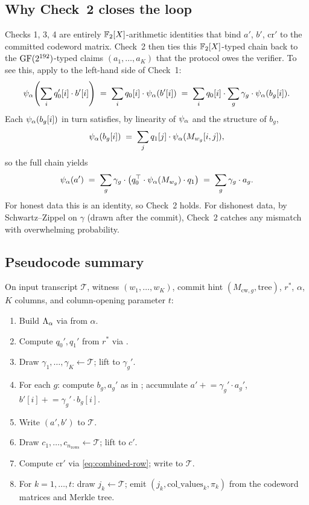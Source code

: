 \subsection{Why Check~2 closes the loop}

Checks 1, 3, 4 are entirely $\mathbb{F}_2[X]$-arithmetic identities that
bind $a'$, $b'$, $\mathrm{cr}'$ to the committed codeword matrix.
Check~2 then ties this $\mathbb{F}_2[X]$-typed chain back to the
$\mathrm{GF}(2^{192})$-typed claims $(a_1, \ldots, a_K)$ that the protocol owes the
verifier. To see this, apply  to the
left-hand side of Check~1:
\[
  \psi_{\alpha}\!\left(\sum_i q_0'[i] \cdot b'[i]\right)
  \;=\;
  \sum_i q_0[i] \cdot \psi_{\alpha}(b'[i])
  \;=\;
  \sum_i q_0[i] \cdot \sum_g \gamma_g \cdot \psi_{\alpha}(b_g[i]).
\]
Each $\psi_{\alpha}(b_g[i])$ in turn satisfies, by linearity of $\psi_{\alpha}$ and
the structure of $b_g$,
\[
  \psi_{\alpha}(b_g[i]) \;=\;
  \sum_j q_1[j] \cdot \psi_{\alpha}(M_{w_g}[i, j]),
\]
so the full chain yields
\[
  \psi_{\alpha}(a')
  \;=\;
  \sum_g \gamma_g \cdot \big( q_0^\top \cdot \psi_{\alpha}(M_{w_g}) \cdot q_1 \big)
  \;=\;
  \sum_g \gamma_g \cdot a_g.
\]
For honest data this is an identity, so Check~2 holds. For dishonest
data, by Schwartz–Zippel on $\gamma$ (drawn after the commit),
Check~2 catches any mismatch with overwhelming probability.

\subsection{Pseudocode summary}

\begin{construction}
\label{cons:prover}
On input transcript $\mathcal{T}$, witness $(w_1, \ldots, w_K)$, commit
hint $(M_{\mathrm{cw}, g}, \mathrm{tree})$, $r^*$, $\alpha$, $K$
columns, and column-opening parameter $t$:
\begin{enumerate}[leftmargin=2em]
  \item Build $\Lambda_{\alpha}$ via  from $\alpha$.
  \item Compute $q_0', q_1'$ from $r^*$ via .
  \item Draw $\gamma_1, \ldots, \gamma_K \leftarrow \mathcal{T}$; lift to $\gamma_g'$.
  \item For each $g$: compute $b_g, a_g'$ as in ; accumulate
    $a' \mathrel{+}= \gamma_g' \cdot a_g'$, $b'[i] \mathrel{+}= \gamma_g' \cdot b_g[i]$.
  \item Write $(a', b')$ to $\mathcal{T}$.
  \item Draw $c_1, \ldots, c_{n_{\mathrm{rows}}} \leftarrow \mathcal{T}$; lift to $c'$.
  \item Compute $\mathrm{cr}'$ via \cref{eq:combined-row}; write to $\mathcal{T}$.
  \item For $k = 1, \ldots, t$: draw $j_k \leftarrow \mathcal{T}$; emit
    $(j_k, \mathrm{col\_values}_k, \pi_k)$ from the codeword matrices and
    Merkle tree.
\end{enumerate}
\end{construction}

